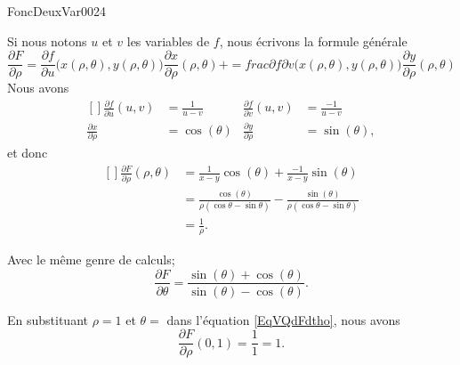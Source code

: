 
\begin{corrige}{FoncDeuxVar0024}

	Si nous notons $u$ et $v$ les variables de $f$, nous écrivons la formule générale
	\begin{equation}
		\frac{ \partial F }{ \partial \rho }=\frac{ \partial f }{ \partial u }\big( x(\rho,\theta),y(\rho,\theta) \big)\frac{ \partial x }{ \partial \rho }(\rho,\theta)+=frac{ \partial f }{ \partial v }\big( x(\rho,\theta),y(\rho,\theta) \big)\frac{ \partial y }{ \partial \rho }(\rho,\theta)
	\end{equation}
	Nous avons
	\begin{equation}
		\begin{aligned}[]
			\frac{ \partial f }{ \partial u }(u,v)&=\frac{1}{ u-v }	&\frac{ \partial f }{ \partial v }(u,v)&=\frac{-1}{ u-v }\\
			\frac{ \partial x }{ \partial \rho }&=\cos(\theta)	&\frac{ \partial y }{ \partial \rho }&=\sin(\theta),
		\end{aligned}
	\end{equation}
	et donc
	\begin{equation}		\label{EqVQdFdtho}
		\begin{aligned}[]
			\frac{ \partial F }{ \partial \rho }(\rho,\theta)&=\frac{1}{ x-y }\cos(\theta)+\frac{ -1 }{ x-y }\sin(\theta)\\
			&=\frac{ \cos(\theta) }{ \rho(\cos\theta-\sin\theta) }-\frac{ \sin(\theta) }{ \rho(\cos\theta-\sin\theta) }\\
			&=\frac{1}{ \rho }.
		\end{aligned}
	\end{equation}

	Avec le même genre de calculs;
	\begin{equation}
		\frac{ \partial F }{ \partial \theta }=\frac{ \sin(\theta)+\cos(\theta) }{ \sin(\theta)-\cos(\theta) }.
	\end{equation}

	En substituant $\rho=1$ et $\theta=$ dans l'équation \eqref{EqVQdFdtho}, nous avons
	\begin{equation}
		\frac{ \partial F }{ \partial \rho }(0,1)=\frac{1}{ 1 }=1.
	\end{equation}
	

\end{corrige}
